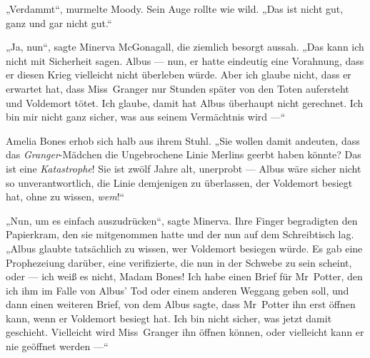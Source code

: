 „Verdammt“, murmelte Moody. Sein Auge rollte wie wild.
„Das ist nicht gut, ganz und gar nicht gut.“

„Ja, nun“, sagte Minerva McGonagall, die ziemlich besorgt aussah.
„Das kann ich nicht mit Sicherheit sagen. Albus — nun, er hatte eindeutig eine Vorahnung, dass er diesen Krieg vielleicht nicht überleben würde. Aber ich glaube nicht, dass er erwartet hat, dass Miss~Granger nur Stunden später von den Toten aufersteht und Voldemort tötet. Ich glaube, damit hat Albus überhaupt nicht gerechnet. Ich bin mir nicht ganz sicher, was aus seinem Vermächtnis wird —“

Amelia Bones erhob sich halb aus ihrem Stuhl.
„Sie wollen damit andeuten, dass das \emph{Granger}-Mädchen die Ungebrochene Linie Merlins geerbt haben könnte? Das ist eine \emph{Katastrophe}! Sie ist zwölf Jahre alt, unerprobt — Albus wäre sicher nicht so unverantwortlich, die Linie demjenigen zu überlassen, der Voldemort besiegt hat, ohne zu wissen, \emph{wem}!“

„Nun, um es einfach auszudrücken“, sagte Minerva. Ihre Finger begradigten den Papierkram, den sie mitgenommen hatte und der nun auf dem Schreibtisch lag.
„Albus glaubte tatsächlich zu wissen, wer Voldemort besiegen würde. Es gab eine Prophezeiung darüber, eine verifizierte, die nun in der Schwebe zu sein scheint, oder — ich weiß es nicht, Madam Bones! Ich habe einen Brief für Mr~Potter, den ich ihm im Falle von Albus’ Tod oder einem anderen Weggang geben soll, und dann einen weiteren Brief, von dem Albus sagte, dass Mr~Potter ihn erst öffnen kann, wenn er Voldemort besiegt hat. Ich bin nicht sicher, was jetzt damit geschieht. Vielleicht wird Miss~Granger ihn öffnen können, oder vielleicht kann er nie geöffnet werden —“


